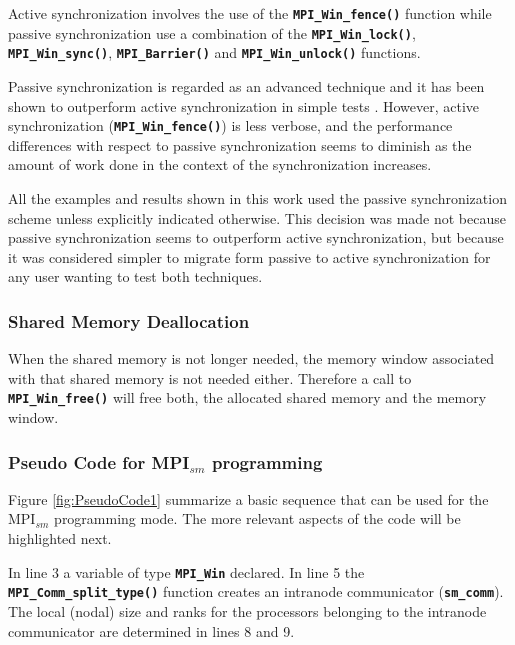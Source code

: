 Active synchronization involves the use of the \textbf{\texttt{MPI\_Win\_fence()}} function while passive synchronization use a combination of the \textbf{\texttt{MPI\_Win\_lock()}}, \textbf{\texttt{MPI\_Win\_sync()}},  \textbf{\texttt{MPI\_Barrier()}} and \textbf{\texttt{MPI\_Win\_unlock()}} functions. 

\medskip

Passive synchronization is regarded as an advanced technique and it has been shown to outperform active synchronization in simple tests\cite{Samfass_2016} \cite{brinskiy2015}. However, active synchronization (\textbf{\texttt{MPI\_Win\_fence()}}) is less verbose, and the performance differences with respect to passive synchronization seems to diminish as the amount of work done in the context of the synchronization increases.

\medskip

All the examples and results shown in this work used the passive synchronization scheme unless explicitly indicated otherwise. This decision was made not because passive synchronization seems to outperform active synchronization, but because it was considered simpler to migrate form passive to active synchronization for any user wanting to test both techniques.

\subsubsection*{Shared Memory Deallocation}
When the shared memory is not longer needed, the memory window associated with that shared memory is not needed either. Therefore a call to \textbf{\texttt{MPI\_Win\_free()}} will free both, the allocated shared memory and the memory window.


\subsubsection*{Pseudo Code for MPI$_{sm}$ programming}

Figure \ref{fig:PseudoCode1} summarize a basic sequence that can be used for the MPI$_{sm}$ programming mode. The more relevant aspects of the code will be highlighted next.

\medskip

In line 3 a variable of type \textbf{\texttt{MPI\_Win}} declared. In line 5 the \textbf{\texttt{MPI\_Comm\_split\_type()}} function creates an intranode communicator (\textbf{\texttt{sm\_comm}}). The local (nodal) size and ranks for the processors belonging to the intranode communicator are determined in lines 8 and 9.

